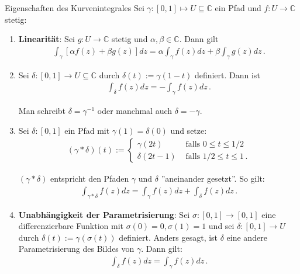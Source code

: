 \documentclass[a4paper,10pt]{article}
\def\C{\mathbb{C}}
\begin{document}
\begin{subbox}{Eigenschaften des Kurvenintegrales}
   Sei $\gamma: [0, 1] \mapsto U \subseteq \C$ ein Pfad und \(f\colon U\to\mathbb{C}\) stetig:

  \begin{enumerate}
    \item{
      \textbf{Linearität}: Sei \(g\colon U\to\mathbb{C}\) stetig und \(\alpha,\beta \in \mathbb{C}\). Dann gilt \begin{align*} \int_{\gamma} [ \alpha f(z) + \beta g(z) ] dz = \alpha \int_{\gamma} f(z)dz + \beta \int_{\gamma} g(z)dz\,. \end{align*}
    }
    \item{
      Sei \(\delta\colon[0,1]\to U\subseteq\mathbb{C}\) durch \(\delta(t):=\gamma(1-t)\) definiert. Dann ist \begin{align*} \int_{\delta} f(z) dz =-\int_{\gamma} f(z) dz\,. \end{align*}
 
      Man schreibt \(\delta=\gamma^{-1}\) oder manchmal auch \(\delta=-\gamma\).
    }
    \item{
      Sei \(\delta\colon[0,1]\) ein Pfad mit \(\gamma (1) = \delta(0)\) und setze:
      \begin{align*} (\gamma * \delta) (t) := \begin{cases} \gamma(2t) &\text{ falls } 0 \leq t \leq 1/2\\ \delta (2t-1) &\text{ falls } 1/2 \leq t \leq 1\,. \end{cases} \end{align*}

      $(\gamma * \delta)$ entspricht den Pfaden $\gamma$ und $\delta$ ''aneinander gesetzt''. So gilt:
      \begin{align*} \int_{\gamma * \delta} f(z) dz = \int_{\gamma} f(z) dz + \int_{\delta} f(z) dz\,. \end{align*}
    }
    \item{
      \textbf{Unabhängigkeit der Parametrisierung}: Sei \(\sigma \colon [0,1] \to [0,1]\) eine differenzierbare Funktion mit \(\sigma(0) =0, \sigma(1)=1\) und sei \(\delta\colon[0,1]\to U\) durch \(\delta (t) := \gamma (\sigma (t))\) definiert. Anders gesagt, ist \(\delta\) eine andere Parametrisierung des Bildes von \(\gamma\). Dann gilt:
      \begin{align*} \int_{\delta} f(z)dz=\int_{\gamma} f(z) dz\,. \end{align*}
    }
  \end{enumerate}
\end{subbox}
\end{document}

